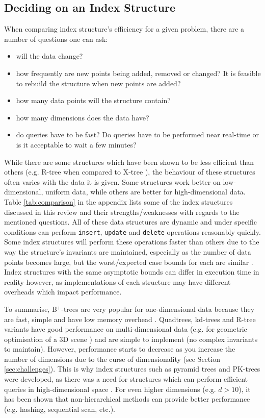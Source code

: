 \subsection{Deciding on an Index Structure}
\label{sec:structure-decision}

When comparing index structure's efficiency for a given problem, there are a number of questions one can ask:
\begin{itemize}
	\item will the data change?
	\item how frequently are new points being added, removed or changed? It is feasible to rebuild the structure when new points are added?
	\item how many data points will the structure contain?
	\item how many dimensions does the data have?
	\item do queries have to be fast? Do queries have to be performed near real-time or is it acceptable to wait a few minutes?
\end{itemize}

While there are some structures which have been shown to be less efficient than others (e.g. R-tree when compared to X-tree \cite{x-tree}), the behaviour of these structures often varies with the data it is given. Some structures work better on low-dimensional, uniform data, while others are better for high-dimensional data. Table \ref{tab:comparison} in the appendix lists some of the index structures discussed in this review and their strengths/weaknesses with regards to the mentioned questions. All of these data structures are dynamic and under specific conditions can perform \texttt{insert}, \texttt{update} and \texttt{delete} operations reasonably quickly. Some index structures will perform these operations faster than others due to the way the structure's invariants are maintained, especially as the number of data points becomes large, but the worst/expected case bounds for each are similar \cite{ubiquitous-btree, r-tree, kd-tree, pyramid-tree, pk-tree, skip-quadtree, rsr-tree, quadtreap, splay-quadtree}. Index structures with the same asymptotic bounds can differ in execution time in reality however, as implementations of each structure may have different overheads which impact performance.

To summarise, B${}^{+}$-trees are very popular for one-dimensional data because they are fast, simple and have low memory overhead \cite{ubiquitous-btree}. Quadtrees, kd-trees and R-tree variants have good performance on multi-dimensional data (e.g. for geometric optimisation of a 3D scene \cite{kd-tree-gpu}) and are simple to implement (no complex invariants to maintain). However, performance starts to decrease as you increase the number of dimensions due to the curse of dimensionality (see Section \ref{sec:challenges}). This is why index structures such as pyramid trees and PK-trees were developed, as there was a need for structures which can perform efficient queries in high-dimensional space \cite{pk-tree, pyramid-tree}. For even higher dimensions (e.g. $d > 10$), it has been shown that non-hierarchical methods can provide better performance (e.g. hashing, sequential scan, etc.).
